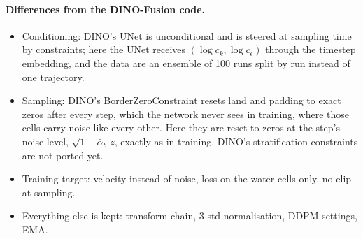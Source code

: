 \documentclass[11pt,a4paper]{article}
\begin{document}
\paragraph{Differences from the DINO-Fusion code.}
\begin{itemize}
  \item Conditioning: DINO's UNet is unconditional and is steered at sampling time by constraints; here the UNet
        receives $(\log c_k, \log c_\epsilon)$ through the timestep embedding, and the data are an ensemble of 100
        runs split by run instead of one trajectory.
  \item Sampling: DINO's BorderZeroConstraint resets land and padding to exact zeros after every step, which the
        network never sees in training, where those cells carry noise like every other. Here they are reset to
        zeros at the step's noise level, $\sqrt{1-\bar\alpha_t}\,z$, exactly as in training. DINO's stratification
        constraints are not ported yet.
  \item Training target: velocity instead of noise, loss on the water cells only, no clip at sampling.
  \item Everything else is kept: transform chain, 3-std normalisation, DDPM settings, EMA.
\end{itemize}
\end{document}
